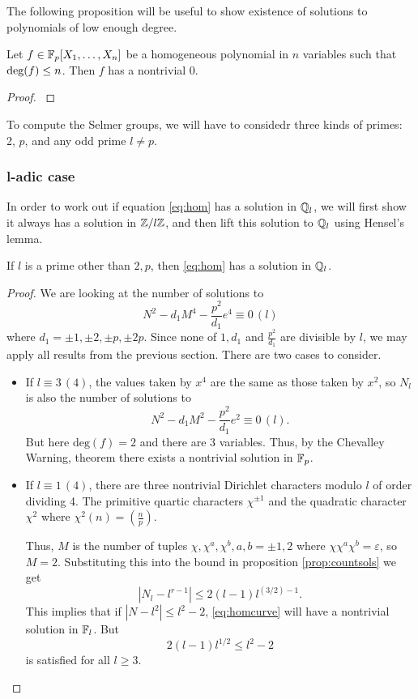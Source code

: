 \documentclass[12pt, a4paper]{amsart}
\begin{document}
The following proposition will be useful to show existence of solutions
to polynomials of low enough degree.

\begin{prop}
  Let $f \in \mathbb{F}_p[X_1, \dots , X_n]$ be a homogeneous polynomial
  in $n$ variables such that $\textnormal{deg}(f) \leq n$. Then $f$ has a nontrivial 0.
\end{prop}

\begin{proof}
  \cite[See][Chapter 1, page 5]{Serre}
\end{proof}

To compute the Selmer groups, we will have to considedr three
kinds of primes: 2, $p$, and any odd prime $l \neq p$.

\subsubsection{l-adic case}

In order to work out if equation \autoref{eq:hom} has a solution in ${\mathbb Q}_l$,
we will first show it always has a solution 
in ${\mathbb Z}/l{\mathbb Z}$, and then lift this solution to ${\mathbb Q}_l$ using Hensel's lemma.

\begin{lemma} \label{local_ladic}
  If $l$ is a prime other than $2,p$, then \autoref{eq:hom} has a solution in ${\mathbb Q}_l$.
\end{lemma}
\begin{proof}
  We are looking at the number of solutions to
  \[ N^2 - d_1M^4 - \frac{p^2}{d_1}e^4 \equiv 0 \, (l)\]
  where $d_1 = \pm 1, \pm 2, \pm p, \pm 2p$. Since none of $1, d_1$ and
  $\frac{p^2}{d_1}$ are divisible by $l$, we may apply all results from
  the previous section. There are two cases to consider.
  
  \begin{itemize}
  \item If $l \equiv 3 \, (4)$, the values taken by $x^4$
    are the same as those taken
    by $x^2$, so $N_l$ is also the number of solutions to
    \[N^2 - d_1M^2 - \frac{p^2}{d_1} e^2 \equiv 0 \, (l).\]
    But here $\text{deg}(f) = 2$ and there are 3 variables.
    Thus, by the Chevalley Warning, theorem there exists a nontrivial solution
    in $\mathbb{F}_p$.

  \item If $l \equiv 1 \, (4)$, there are three nontrivial Dirichlet
    characters modulo $l$ of order dividing 4. The primitive quartic
    characters $\chi^{\pm 1}$ and the quadratic character $\chi^2$ where $\chi^2(n) =
    (\frac{n}{p})$.

    Thus, $M$ is the number of tuples $\chi, \chi^a, \chi^b,
    a,b = \pm 1, 2$ where $\chi \chi^a \chi^b = \varepsilon$, so $M = 2$.
    Substituting this into the bound in proposition \autoref{prop:countsols} we get
    \[|N_l - l^{r-1} | \leq 2(l-1) l^{(3/2)-1}.\]
    This implies that if $|N-l^2| \leq l^2-2$, \autoref{eq:homcurve} will have
    a nontrivial solution in $\mathbb{F}_l$. But
    \[2(l-1)l^{1/2} \leq l^2 - 2\]
    is satisfied for all $l \geq 3$.
  \end{itemize}
  
\end{proof}
\end{document}
